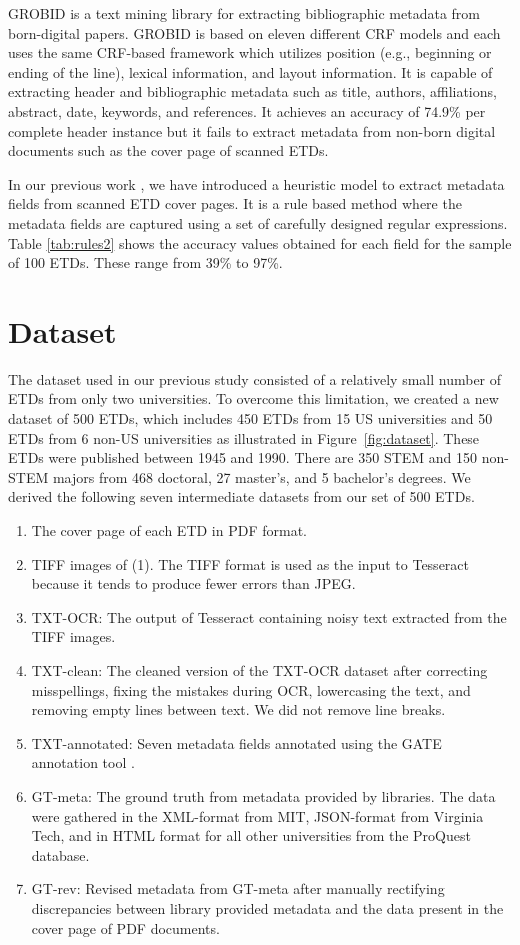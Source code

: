 \documentclass{article}
\begin{document}
GROBID \cite{lopez2009grobid} is a text mining library for extracting bibliographic metadata from born-digital papers. GROBID is based on eleven different CRF models and each uses the same CRF-based framework which utilizes position (e.g., beginning or ending of the line), lexical information, and layout information. It is capable of extracting header and bibliographic metadata such as title, authors, affiliations, abstract, date, keywords, and references. It achieves an accuracy of 74.9\% per complete header instance but it fails to extract metadata from non-born digital documents such as the cover page of scanned ETDs.

In our previous work \cite{choudhury-jcdl2020}, we have introduced a heuristic model to extract metadata fields from scanned ETD cover pages. It is a rule based method where the metadata fields are captured using a set of carefully designed regular expressions. Table \ref{tab:rules2} shows the accuracy values obtained for each field for the sample of 100 ETDs.
These range from 39\% to 97\%.

\section{Dataset}
The dataset used in our previous study \cite{choudhury-jcdl2020} consisted of a relatively small number of ETDs from only two universities. To overcome this limitation, we created a new dataset of 500 ETDs, which includes 450 ETDs from 15 US universities and 50 ETDs from 6 non-US universities as illustrated in Figure~\ref{fig:dataset}. These ETDs were published between 1945 and 1990. There are 350 STEM and 150 non-STEM majors from 468 doctoral, 27 master's, and 5 bachelor's degrees. We derived the following seven intermediate datasets from our set of 500 ETDs.

\begin{enumerate}
    \item The cover page of each ETD in PDF format. 
    \item TIFF images of (1). The TIFF format is used as the input to Tesseract because it tends to produce fewer errors than JPEG.
    \item TXT-OCR: The output of Tesseract containing noisy text extracted from the TIFF images.
    \item TXT-clean: The cleaned version of the TXT-OCR dataset after correcting misspellings, fixing the mistakes during OCR, lowercasing the text, and removing empty lines between text. We did not remove line breaks.
    \item TXT-annotated: Seven metadata fields annotated using the GATE annotation tool \cite{gate}.
    \item GT-meta: The ground truth from metadata provided by libraries. The data were gathered in the XML-format from MIT, JSON-format from Virginia Tech, and in HTML format for all other universities from the ProQuest database.
    \item GT-rev: Revised metadata from GT-meta after manually rectifying discrepancies between library provided metadata and the data present in the cover page of PDF documents. 
\end{enumerate}
\end{document}
